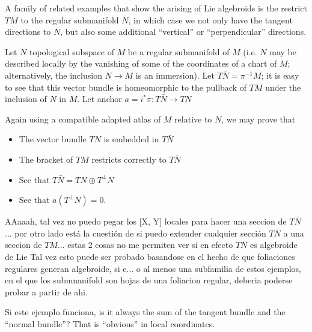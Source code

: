 A family of related examples that show the arising of Lie algebroids is the restrict $TM$ to the regular submanifold $N$, in which case we not only have the tangent directions to $N$, but also some additional ``vertical'' or ``perpendicular'' directions.

Let $N$ topological subspace of $M$ be a regular submanifold of $M$ (i.e. $N$ may be described locally by the vanishing of some of the coordinates of a chart of $M$; alternatively, the inclusion $N \to M$ is an immersion). Let $T\bar N = \pi^{-1} M$; it is easy to see that this vector bundle is homeomorphic to the pullback of $TM$ under the inclusion of $N$ in $M$. Let anchor $a = i^*\pi: T \bar N \to TN$ 

Again using a compatible adapted atlas of $M$ relative to $N$, we may prove that 
\begin{itemize}
\item The vector bundle $TN$ is embedded in $T \bar N$
\item The bracket of $TM$ restricts correctly to $T \bar N$
\item See that $T \bar N = TN \oplus T^\perp N$
\item See that $a(T^\perp N) = 0$.
\end{itemize}
 
AAaaah, tal vez no puedo pegar los [X, Y] locales para hacer una seccion de $T \bar N$... por otro lado está la cuestión de si puedo extender cualquier sección $T \bar N$ a una seccion de $TM$... estas 2 cosas no me permiten ver si en efecto $T \bar N$ es algebroide de Lie  Tal vez esto puede ser probado basandose en el hecho de que foliaciones regulares generan algebroide, si e... o al menos una subfamilia de estos ejemplos, en el que los submnanifold son hojas de una foliacion regular, deberia poderse probar a partir de ahi.

Si este ejemplo funciona, is it always the sum of the tangent bundle and the ``normal bundle''? That is ``obvious'' in local coordinates.




